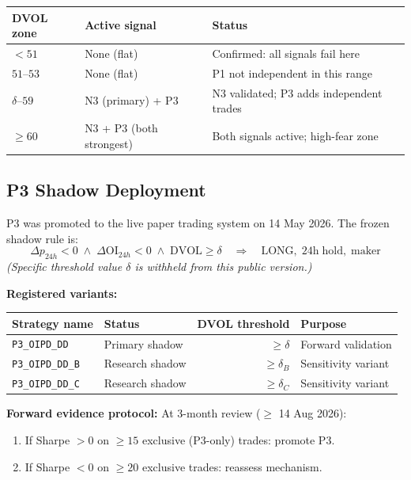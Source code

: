 \documentclass[12pt, a4paper]{article}
\theoremstyle{plain}
\theoremstyle{definition}
\newcommand{\DVOL}{\mathrm{DVOL}}
\newcommand{\OI}{\mathrm{OI}}
\begin{document}
\begin{center}
\begin{tabular}{lll}
\toprule
DVOL zone & Active signal & Status \\
\midrule
$< 51$              & None (flat)                & Confirmed: all signals fail here \\
$51$--$53$          & None (flat)                & P1 not independent in this range \\
$\delta$--$59$      & N3 (primary) + P3          & N3 validated; P3 adds independent trades \\
$\geq 60$           & N3 + P3 (both strongest)   & Both signals active; high-fear zone \\
\bottomrule
\end{tabular}
\end{center}

\subsection{P3 Shadow Deployment}
\label{sec:p3shadow}

P3 was promoted to the live paper trading system on 14 May 2026.
The frozen shadow rule is:
\begin{equation*}
  \Delta p_{24h} < 0 \;\wedge\; \Delta\OI_{24h} < 0 \;\wedge\; \DVOL \geq \delta
  \quad\Longrightarrow\quad \text{LONG},\; 24\mathrm{h\;hold},\; \text{maker}
\end{equation*}
\noindent\textit{(Specific threshold value $\delta$ is withheld from this public version.)}

\textbf{Registered variants:}
\begin{center}
\begin{tabular}{llrl}
\toprule
Strategy name & Status & DVOL threshold & Purpose \\
\midrule
\texttt{P3\_OIPD\_DD}     & Primary shadow & $\geq \delta$ & Forward validation \\
\texttt{P3\_OIPD\_DD\_B} & Research shadow & $\geq \delta_B$ & Sensitivity variant \\
\texttt{P3\_OIPD\_DD\_C} & Research shadow & $\geq \delta_C$ & Sensitivity variant \\
\bottomrule
\end{tabular}
\end{center}

\textbf{Forward evidence protocol:} At 3-month review ($\geq$ 14 Aug 2026):
\begin{enumerate}[noitemsep]
  \item If Sharpe $> 0$ on $\geq 15$ exclusive (P3-only) trades: promote P3.
  \item If Sharpe $< 0$ on $\geq 20$ exclusive trades: reassess mechanism.
\end{enumerate}
\end{document}
